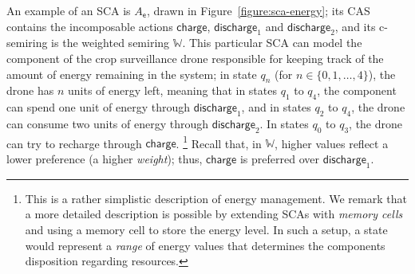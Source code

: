 \documentclass[a4paper]{article}
\newcommand{\wcsemiring}{\mathbb{W}}
\theoremstyle{definition}
\newcommand{\discharge}{\mathsf{discharge}}
\newcommand{\charge}{\mathsf{charge}}
\newcommand{\e}{\mathsf{e}}
\begin{document}
An example of an SCA is $A_\e$, drawn in Figure~\ref{figure:sca-energy}; its CAS contains the incomposable actions $\charge$, $\discharge_1$ and $\discharge_2$, and its c-semiring is the weighted semiring $\wcsemiring$. This particular SCA can model the component of the crop surveillance drone responsible for keeping track of the amount of energy remaining in the system; in state $q_n$ (for $n \in \{0,1,\dots,4\}$), the drone has $n$ units of energy left, meaning that in states $q_1$ to $q_4$, the component can spend one unit of energy through $\discharge_1$, and in states $q_2$ to $q_4$, the drone can consume two units of energy through $\discharge_2$. In states $q_0$ to $q_3$, the drone can try to recharge through $\charge$.%
\footnote{This is a rather simplistic description of energy management. We remark that a more detailed description is possible by extending SCAs with \emph{memory cells}~\cite{jongmans-kappe-arbab-2017} and using a memory cell to store the energy level. In such a setup, a state would represent a \emph{range} of energy values that determines the components disposition regarding resources.}
Recall that, in $\wcsemiring$, higher values reflect a lower preference (a higher \emph{weight}); thus, $\charge$ is preferred over $\discharge_1$.
\end{document}
